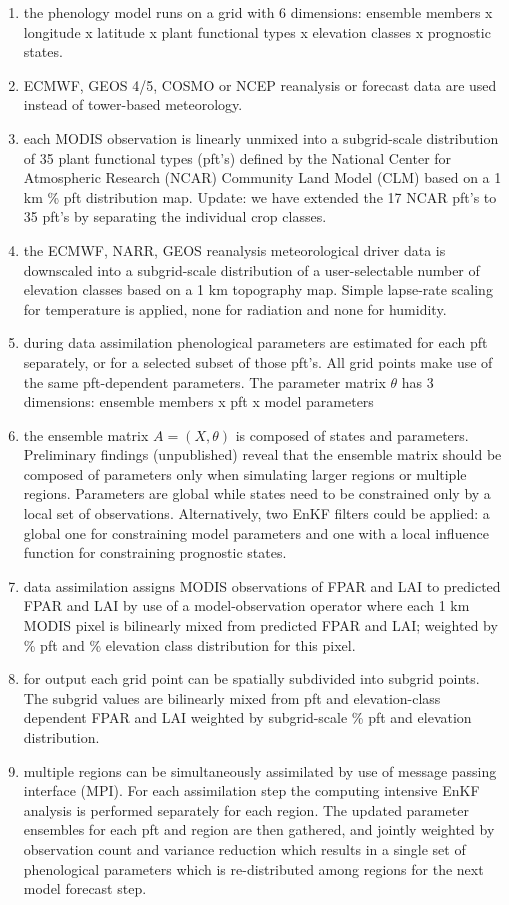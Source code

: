 \documentclass[a4paper,12pt]{article}
\begin{document}
\begin{enumerate}
\item the phenology model runs on a grid with 6 dimensions: ensemble members x longitude x latitude x plant functional types x elevation classes x prognostic states. 
\item ECMWF, GEOS 4/5, COSMO or NCEP reanalysis or forecast data are used instead of tower-based meteorology.
\item each MODIS observation is linearly unmixed into a subgrid-scale distribution of 35 plant functional types (pft's) defined by the National Center for Atmospheric Research (NCAR) Community Land Model (CLM) based on a  1 km \% pft distribution map. Update: we have extended the 17 NCAR pft's to 35 pft's by separating the individual crop classes.
\item the ECMWF, NARR, GEOS reanalysis meteorological driver data is downscaled into a subgrid-scale distribution of a user-selectable number of elevation classes based on a 1 km topography map. Simple lapse-rate scaling for temperature is applied, none for radiation and none for humidity.
\item during data assimilation phenological parameters are estimated for each pft separately, or for a selected subset of those pft's. All grid points make use of the same pft-dependent parameters. The parameter matrix $\theta$ has 3 dimensions: ensemble members x pft x model parameters
\item the ensemble matrix $A=(X,\theta)$ is composed of states and parameters. Preliminary findings (unpublished) reveal that the ensemble matrix should be composed of parameters only when simulating larger regions or multiple regions. Parameters are global while states need to be constrained only by a local set of observations. Alternatively, two EnKF filters could be applied: a global one for constraining model parameters and one with a local influence function for constraining prognostic states.
\item data assimilation assigns MODIS observations of FPAR and LAI to predicted FPAR and LAI by use of a model-observation operator where each 1 km MODIS pixel is bilinearly mixed from predicted FPAR and LAI; weighted by \% pft and \% elevation class distribution for this pixel.
\item for output each grid point can be spatially subdivided into subgrid points. The subgrid values are bilinearly mixed from pft and elevation-class dependent FPAR and LAI weighted by subgrid-scale \% pft and elevation distribution.
\item multiple regions can be simultaneously assimilated by use of message passing interface (MPI). For each assimilation step the computing intensive EnKF analysis is performed separately for each region. The updated parameter ensembles for each pft and region are then gathered, and jointly weighted by observation count and variance reduction which results in a single set of phenological parameters which is re-distributed among regions for the next model forecast step.
\end{enumerate}
\end{document}
